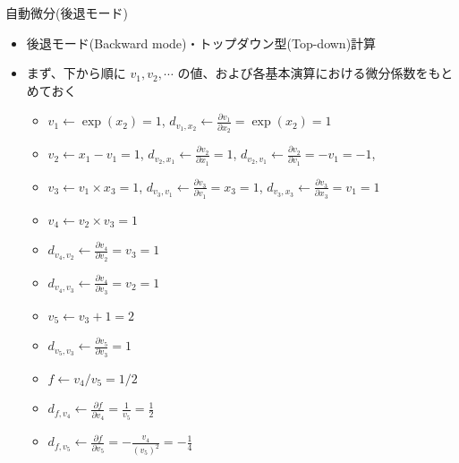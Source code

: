 \begin{frame}[t,fragile]{自動微分(後退モード)}
  \begin{itemize}
  \item 後退モード(Backward mode)・トップダウン型(Top-down)計算
  \item まず、下から順に $v_1, v_2, \cdots$ の値、および各基本演算における微分係数をもとめておく
    \begin{itemize}
    \item $v_1 \leftarrow \exp(x_2) = 1$, $d_{v_1,x_2} \leftarrow \frac{\partial v_1}{\partial x_2} = \exp(x_2) = 1$
    \item $v_2 \leftarrow x_1 - v_1 = 1$, $d_{v_2,x_1} \leftarrow \frac{\partial v_2}{\partial x_1} = 1$, $d_{v_2,v_1} \leftarrow \frac{\partial v_2}{\partial v_1} = -v_1 = -1$,
    \item $v_3 \leftarrow v_1 \times x_3 = 1$, $d_{v_3,v_1} \leftarrow \frac{\partial v_3}{\partial v_1} = x_3 = 1$, $d_{v_3,x_3} \leftarrow \frac{\partial v_3}{\partial x_3} = v_1 = 1$
    \item $v_4 \leftarrow v_2 \times v_3 = 1$
    \item $d_{v_4,v_2} \leftarrow \frac{\partial v_4}{\partial v_2} = v_3 = 1$
    \item $d_{v_4,v_3} \leftarrow \frac{\partial v_4}{\partial v_3} = v_2 = 1$
    \item $v_5 \leftarrow v_3 + 1 = 2$
    \item $d_{v_5,v_3} \leftarrow \frac{\partial v_5}{\partial v_3} = 1$
    \item $f \leftarrow v_4 / v_5 = 1/2$
    \item $d_{f,v_4} \leftarrow \frac{\partial f}{\partial v_4} = \frac{1}{v_5} = \frac{1}{2}$
    \item $d_{f,v_5} \leftarrow \frac{\partial f}{\partial v_5} = -\frac{v_4}{(v_5)^2} = -\frac{1}{4}$
    \end{itemize}

\end{itemize}
\end{frame}
